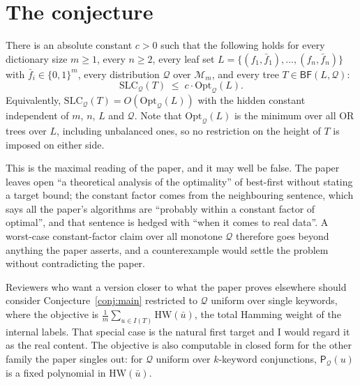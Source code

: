 \documentclass{conjura-conjecture}
\newcommand{\bits}{\{0,1\}}
\newcommand{\Qd}{\mathcal{Q}}
\newcommand{\Mon}{\mathcal{M}}
\newcommand{\Pcost}{\mathsf{P}}
\newcommand{\SLC}{\mathrm{SLC}}
\newcommand{\Opt}{\mathrm{Opt}}
\newcommand{\BF}{\mathsf{BF}}
\newcommand{\HW}{\mathrm{HW}}
\begin{document}
\section{The conjecture}\label{sec:conjectures}

\begin{conjecture}\label{conj:main}
There is an absolute constant $c > 0$ such that the following holds for
every dictionary size $m \ge 1$, every $n \ge 2$, every leaf set
$L = \{(f_1,\bar f_1),\dots,(f_n,\bar f_n)\}$ with
$\bar f_i \in \bits^m$, every distribution $\Qd$ over $\Mon_m$, and every
tree $T \in \BF(L,\Qd)$:
\[
  \SLC_{\Qd}(T) \;\le\; c \cdot \Opt_{\Qd}(L).
\]
Equivalently, $\SLC_{\Qd}(T) = O(\Opt_{\Qd}(L))$ with the hidden constant
independent of $m$, $n$, $L$ and $\Qd$. Note that $\Opt_{\Qd}(L)$ is the
minimum over all OR trees over $L$, including unbalanced ones, so no
restriction on the height of $T$ is imposed on either side.
\end{conjecture}

\begin{remark}\label{rem:strength}
This is the maximal reading of the paper, and it may well be false. The
paper leaves open ``a theoretical analysis of the optimality'' of
best-first without stating a target bound; the constant factor comes from
the neighbouring sentence, which says all the paper's algorithms are
``probably within a constant factor of optimal'', and that sentence is
hedged with ``when it comes to real data''. A worst-case constant-factor
claim over all monotone $\Qd$ therefore goes beyond anything the paper
asserts, and a counterexample would settle the problem without
contradicting the paper.
\end{remark}

\begin{remark}\label{rem:single}
Reviewers who want a version closer to what the paper proves elsewhere
should consider Conjecture~\ref{conj:main} restricted to $\Qd$ uniform
over single keywords, where the objective is
$\frac{1}{m}\sum_{u \in I(T)} \HW(\bar u)$, the total Hamming weight of
the internal labels. That special case is the natural first target and I
would regard it as the real content. The objective is also computable in
closed form for the other family the paper singles out: for $\Qd$ uniform
over $k$-keyword conjunctions, $\Pcost_{\Qd}(u)$ is a fixed polynomial in
$\HW(\bar u)$.
\end{remark}
\end{document}
